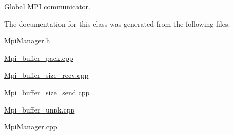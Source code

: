 Global M\+PI communicator. 



The documentation for this class was generated from the following files\+:\begin{DoxyCompactItemize}
\item 
\hyperlink{_mpi_manager_8h}{Mpi\+Manager.\+h}\item 
\hyperlink{_mpi__buffer__pack_8cpp}{Mpi\+\_\+buffer\+\_\+pack.\+cpp}\item 
\hyperlink{_mpi__buffer__size__recv_8cpp}{Mpi\+\_\+buffer\+\_\+size\+\_\+recv.\+cpp}\item 
\hyperlink{_mpi__buffer__size__send_8cpp}{Mpi\+\_\+buffer\+\_\+size\+\_\+send.\+cpp}\item 
\hyperlink{_mpi__buffer__unpk_8cpp}{Mpi\+\_\+buffer\+\_\+unpk.\+cpp}\item 
\hyperlink{_mpi_manager_8cpp}{Mpi\+Manager.\+cpp}\end{DoxyCompactItemize}
